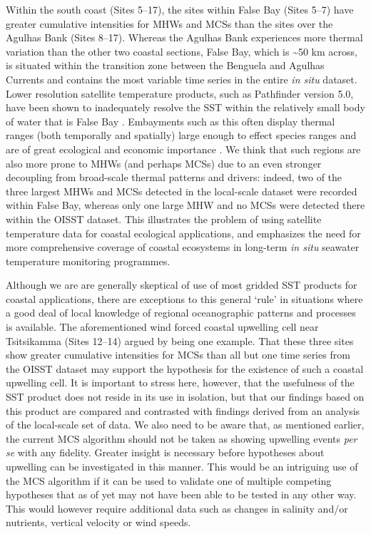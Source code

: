 \documentclass[a4paper,10pt,review]{elsarticle}
\begin{document}
Within the south coast (Sites 5--17), the sites within False Bay (Sites 5--7) have greater cumulative intensities for MHWs and MCSs than the sites over the Agulhas Bank (Sites 8--17). Whereas the Agulhas Bank experiences more thermal variation than the other two coastal sections, False Bay, which is \textasciitilde50 km across, is situated within the transition zone between the Benguela and Agulhas Currents \citep{Smit2013} and contains the most variable time series in the entire \emph{in situ} dataset. Lower resolution satellite temperature products, such as Pathfinder version 5.0, have been shown to inadequately resolve the SST within the relatively small body of water that is False Bay \citep{Dufois2012}. Embayments such as this often display thermal ranges (both temporally and spatially) large enough to effect species ranges \citep{Ling2009} and are of great ecological \citep{Klumb2003} and economic importance \citep{Lugendo2005}. We think that such regions are also more prone to MHWs (and perhaps MCSs) due to an even stronger decoupling from broad-scale thermal patterns and drivers: indeed, two of the three largest MHWs and MCSs detected in the local-scale dataset were recorded within False Bay, whereas only one large MHW and no MCSs were detected there within the OISST dataset. This illustrates the problem of using satellite temperature data for coastal ecological applications, and emphasizes the need for more comprehensive coverage of coastal ecosystems in long-term \emph{in situ} seawater temperature monitoring programmes.

Although we are are generally skeptical of use of most gridded SST products for coastal applications, there are exceptions to this general `rule' in situations where a good deal of local knowledge of regional oceanographic patterns and processes is available. The aforementioned wind forced coastal upwelling cell near Tsitsikamma (Sites 12--14) argued by \citet{Roberts2005} being one example. That these three sites show greater cumulative intensities for MCSs than all but one time series from the OISST dataset may support the hypothesis for the existence of such a coastal upwelling cell. It is important to stress here, however, that the usefulness of the SST product does not reside in its use in isolation, but that our findings based on this product are compared and contrasted with findings derived from an analysis of the local-scale set of data. We also need to be aware that, as mentioned earlier, the current MCS algorithm should not be taken as showing upwelling events \emph{per se} with any fidelity. Greater insight is necessary before hypotheses about upwelling can be investigated in this manner. This would be an intriguing use of the MCS algorithm if it can be used to validate one of multiple competing hypotheses that as of yet may not have been able to be tested in any other way. This would however require additional data such as changes in salinity and/or nutrients, vertical velocity or wind speeds.
\end{document}
